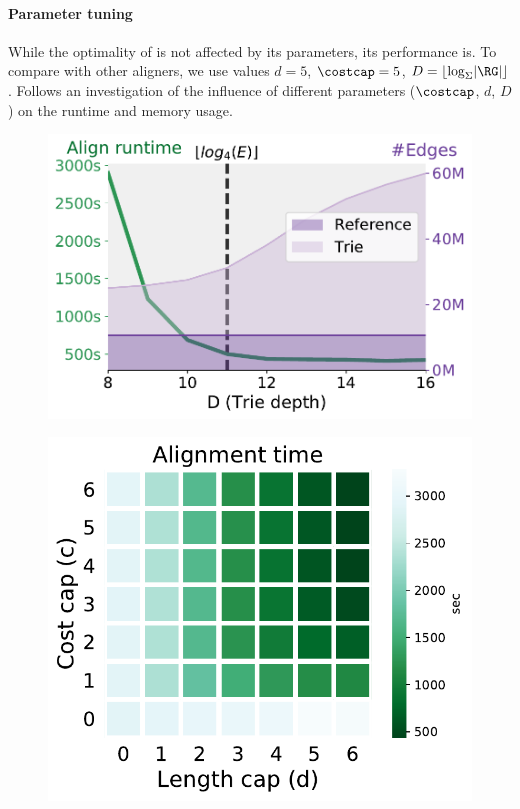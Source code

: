 \paragraph{Parameter tuning} \label{TRIEsubsec:parameter_estimation}

While the optimality of \astarix is not affected by its parameters, its
performance is. To compare with other aligners, we use values \mbox{$d=5$},
\mbox{$\costcap=5$}, \mbox{$D = \lfloor \log_\Sigma \lvert \RG \rvert \rfloor$}.
Follows an investigation of the influence of different parameters ($\costcap$,
$d$, $D$) on the runtime and memory usage.

\begin{figure}[H]
	\centering
	\begin{minipage}{0.45\linewidth}
		\centering
		\includegraphics[width=\linewidth]{figs/trie/MHC1-trie-vs-D.pdf}
		\label{TRIEfig:trie_vs_D}
	\end{minipage}%
	\begin{minipage}{0.45\linewidth}
		\centering
		\includegraphics[width=0.8\linewidth]{figs/heuristic/MHC1-heatmap-c_vs_d-align_sec.pdf}

\end{minipage}
\end{figure}
